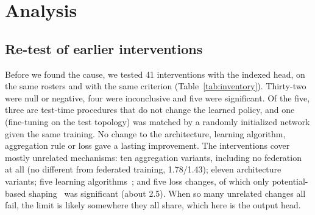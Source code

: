 \documentclass[conference]{IEEEtran}
\begin{document}
\section{Analysis}\label{sec:analysis}

\subsection{Re-test of earlier interventions}\label{sec:inventory}
Before we found the cause, we tested 41 interventions with the indexed head, on the same
rosters and with the same criterion (Table~\ref{tab:inventory}). Thirty-two were null or
negative, four were inconclusive and five were significant. Of the five, three are
test-time procedures that do not change the learned policy, and one (fine-tuning on the
test topology) was matched by a randomly initialized network given the same training. No
change to the architecture, learning algorithm, aggregation rule or loss gave a lasting
improvement. The interventions cover mostly unrelated mechanisms: ten aggregation variants,
including no federation at all (no different from federated training, 1.78/1.43); eleven
architecture variants; five learning algorithms~\cite{ppo,munchausen,qrdqn,maml}; and five
loss changes, of which only potential-based shaping~\cite{potential} was significant (about
2.5). When so many unrelated changes all fail, the limit is likely somewhere they all
share, which here is the output head.
\end{document}
